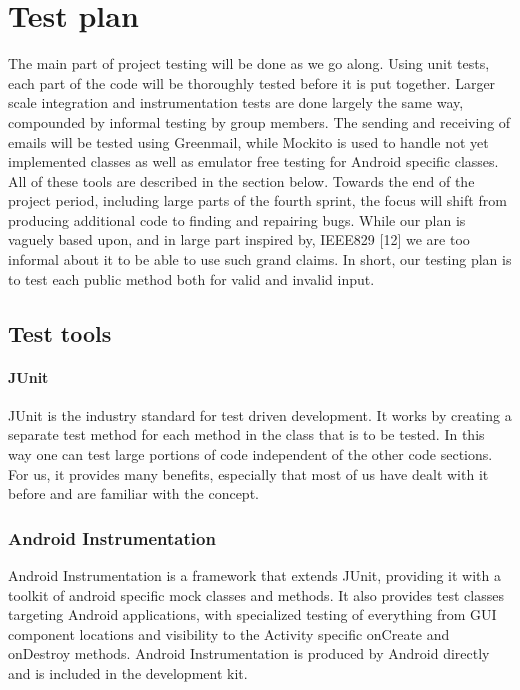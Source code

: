 \chapter{Test plan}

The main part of project testing will be done as we go along. Using unit tests, each part of the code will be thoroughly tested before it is put together. Larger scale integration and instrumentation tests are done largely the same way, compounded by informal testing by group members. The sending and receiving of emails will be tested using Greenmail, while Mockito is used to handle not yet implemented classes as well as emulator free testing for Android specific classes. All of these tools are described in the section below. Towards the end of the project period, including large parts of the fourth sprint, the focus will shift from producing additional code to finding and repairing bugs. While our plan is vaguely based upon, and in large part inspired by, IEEE829 [12] we are too informal about it to be able to use such grand claims. In short, our testing plan is to test each public method both for valid and invalid input.

\section{Test tools}
\subsubsection{JUnit}
JUnit is the industry standard for test driven development. It works by creating a separate test method for each method in the class that is to be tested. In this way one can test large portions of code independent of the other code sections. For us, it provides many benefits, especially that most of us have dealt with it before and are familiar with the concept.

\subsection{Android Instrumentation}
Android Instrumentation is a framework that extends JUnit, providing it with a toolkit of android specific mock classes and methods. It also provides test classes targeting Android applications, with specialized testing of everything from GUI component locations and visibility to the Activity specific onCreate and onDestroy methods. Android Instrumentation is produced by Android directly and is included in the development kit.

